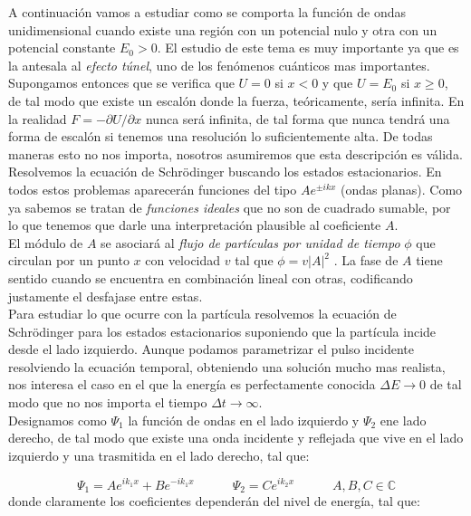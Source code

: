 \documentclass[12pt]{article}
\newcommand{\tquad}{\quad \quad \quad}
\begin{document}
A continuación vamos a estudiar como se comporta la función de ondas unidimensional cuando existe una región con un potencial nulo y otra con un potencial constante $E_0>0$. El estudio de este tema es muy importante ya que es la antesala al \textit{efecto túnel}, uno de los fenómenos cuánticos mas importantes. \\


Supongamos entonces que se verifica que $U=0$ si $x<0$ y que $U=E_0$ si $x \geq 0$, de tal modo que existe un escalón donde la fuerza, teóricamente, sería infinita. En la realidad $F=- \partial U / \partial x$ nunca será infinita, de tal forma que nunca tendrá una forma de escalón si tenemos una resolución lo suficientemente alta. De todas maneras esto no nos importa, nosotros asumiremos que esta descripción es válida. \\

Resolvemos la ecuación de Schrödinger buscando los estados estacionarios. En todos estos problemas aparecerán funciones del tipo $Ae^{\pm ik  x}$ (ondas planas). Como ya sabemos se tratan de \textit{funciones ideales} que no son de cuadrado sumable, por lo que tenemos que darle una interpretación plausible al coeficiente $A$. \\

El módulo de $A$ se asociará al \textit{flujo de partículas por unidad de tiempo} $\phi$ que circulan por un punto $x$ con velocidad $v$ tal que $\phi = v |A|^2$ . La fase de $A$ tiene sentido cuando se encuentra en combinación lineal con otras, codificando justamente el desfajase entre estas. \\

Para estudiar lo que ocurre con la partícula resolvemos la ecuación de Schrödinger para los estados estacionarios suponiendo que la partícula incide desde el lado izquierdo. Aunque podamos parametrizar el pulso incidente resolviendo la ecuación temporal, obteniendo una solución mucho mas realista, nos interesa el caso en el que la energía es perfectamente conocida $\Delta E \rightarrow 0$ de tal modo que no nos importa el tiempo $\Delta t \rightarrow \infty$. \\

Designamos como $\Psi_1$ la función de ondas en el lado izquierdo y $\Psi_2$ ene lado derecho, de tal modo que existe una onda incidente y reflejada que vive en el lado izquierdo y una trasmitida en el lado derecho, tal que:

\begin{equation}
\Psi_1 = A e^{ik_1x} + B e^{-ik_1 x} \tquad \Psi_2 = C e^{ik_2x} \tquad A,B,C \in \mathbb{C}
\end{equation}
donde claramente los coeficientes dependerán del nivel de energía, tal que:
\end{document}

